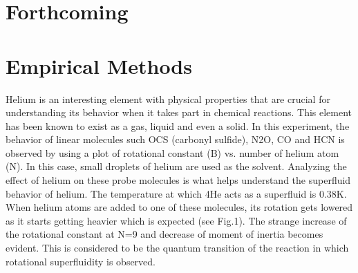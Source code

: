 \documentclass[a0b,landscape]{a0poster}
\begin{document}
\begin{multicols}{3}

\section*{Forthcoming}

\columnbreak



\color{Black} %

\section*{Empirical Methods}

Helium is an interesting element with physical properties that are crucial for understanding its behavior when it takes part in chemical reactions.  This element has been known to exist as a gas, liquid and even a solid.  In this experiment, the behavior of linear molecules such OCS (carbonyl sulfide), N2O, CO and HCN is observed by using a plot of rotational constant (B) vs. number of helium atom (N). In this case, small droplets of helium are used as the solvent.   Analyzing the effect of helium on these probe molecules is what helps understand the superfluid behavior of helium.   The temperature at which 4He acts as a superfluid is 0.38K.  When helium atoms are added to one of these molecules, its rotation gets lowered as it starts getting heavier which is expected (see Fig.1).  The strange increase of the rotational constant at N=9 and decrease of moment of inertia becomes evident.  This is considered to be the quantum transition of the reaction in which rotational superfluidity is observed.




\color{Black}

\end{multicols}
\end{document}
